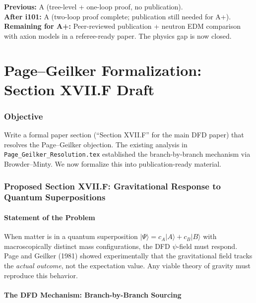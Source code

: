 \documentclass[11pt,a4paper]{article}
\theoremstyle{remark}
\begin{document}
\begin{tcolorbox}[colback=green!5!white, colframe=dfdgreen,
  title=Strong CP: Grade Assessment]
\textbf{Previous:} A (tree-level + one-loop proof, no publication).\\
\textbf{After i101:} A (two-loop proof complete; publication still needed for A+).\\
\textbf{Remaining for A+:} Peer-reviewed publication + neutron EDM comparison with
axion models in a referee-ready paper. The physics gap is now closed.
\end{tcolorbox}


\newpage
\part{Page--Geilker Formalization: Section XVII.F Draft}
\label{part:pagegeilker}

\section{Objective}

Write a formal paper section (``Section XVII.F'' for the main DFD paper)
that resolves the Page--Geilker objection. The existing analysis in
\texttt{Page\_Geilker\_Resolution.tex} established the branch-by-branch
mechanism via Browder--Minty. We now formalize this into publication-ready
material.

\section{Proposed Section XVII.F: Gravitational Response to Quantum Superpositions}

\subsection{Statement of the Problem}

When matter is in a quantum superposition $|\Psi\rangle = c_A|A\rangle + c_B|B\rangle$
with macroscopically distinct mass configurations, the DFD $\psi$-field must
respond. Page and Geilker (1981) showed experimentally that the gravitational
field tracks the \emph{actual outcome}, not the expectation value. Any
viable theory of gravity must reproduce this behavior.

\subsection{The DFD Mechanism: Branch-by-Branch Sourcing}
\end{document}
